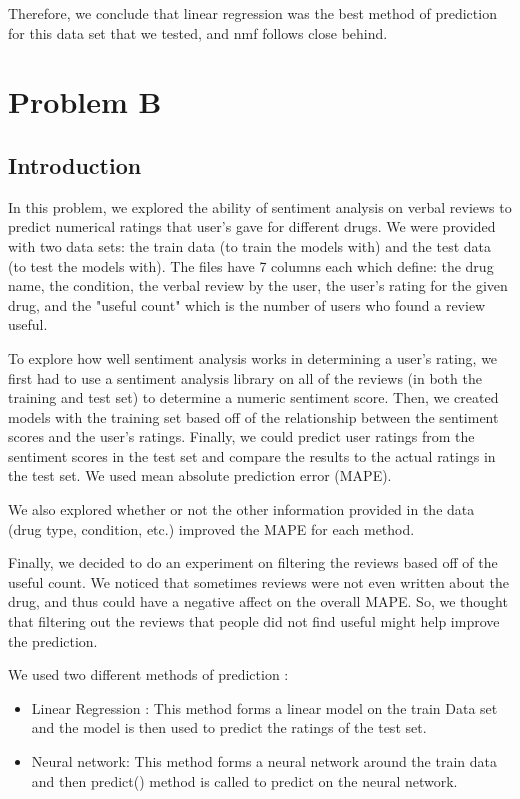 \documentclass{article}
\begin{document}
Therefore, we conclude that linear regression was the best method of prediction for this data set that we tested, and nmf follows close behind. 

\section{Problem B}

\subsection{Introduction}


In this problem, we explored the ability of sentiment analysis on verbal reviews to predict numerical ratings that user's gave for different drugs. We were provided with two data sets: the train data (to train the models with) and the test data (to test the models with). The files have 7 columns each which define: the drug name, the condition, the verbal review by the user, the user's rating for the given drug, and the "useful count" which is the number of users who found a review useful. 

To explore how well sentiment analysis works in determining a user's rating, we first had to use a sentiment analysis library on all of the reviews (in both the training and test set) to determine a numeric sentiment score. Then, we created models with the training set based off of the relationship between the sentiment scores and the user's ratings. Finally, we could predict user ratings from the sentiment scores in the test set and compare the results to the actual ratings in the test set. We used mean absolute prediction error (MAPE).

We also explored whether or not the other information provided in the data (drug type, condition, etc.) improved the MAPE for each method. 

Finally, we decided to do an experiment on filtering the reviews based off of the useful count. We noticed that sometimes reviews were not even written about the drug, and thus could have a negative affect on the overall MAPE. So, we thought that filtering out the reviews that people did not find useful might help improve the prediction. 

We used two different methods of prediction :
\begin{itemize}
    \item Linear Regression : This method forms a linear model on the train Data set and the model is then used to predict the ratings of the test set.
    \item Neural network: This method forms a neural network around the train data and then predict() method is called to predict on the neural network.
\end{itemize}
\end{document}

